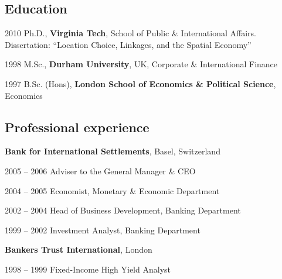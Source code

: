 \documentclass[letter,11pt]{article}
\newlength{\cvlabelw}
\newenvironment{cvlist}[1][2.5cm]{%
  \setlength{\cvlabelw}{#1}%
  \begin{list}{}{%
    \setlength{\leftmargin}{\cvlabelw}\setlength{\labelwidth}{\cvlabelw}%
    \setlength{\labelsep}{0pt}\setlength{\itemindent}{0pt}\setlength{\listparindent}{0pt}%
    \setlength{\itemsep}{4pt}\setlength{\parsep}{0pt}\setlength{\topsep}{3pt}\setlength{\partopsep}{0pt}%
    \renewcommand{\makelabel}[1]{##1\hfil}}}{\end{list}}
\begin{document}
\subsection*{Education}
\begin{cvlist}[2.3cm]
\item[2010] Ph.D., \textbf{Virginia Tech}, School of Public \& International Affairs. Dissertation: \enquote{Location Choice, Linkages, and the Spatial Economy}
\item[1998] M.Sc., \textbf{Durham University}, UK, Corporate \& International Finance
\item[1997] B.Sc. (Hons), \textbf{London School of Economics \& Political Science}, Economics
\end{cvlist}

\subsection*{Professional experience}
\noindent\textbf{Bank for International Settlements}, Basel, Switzerland
\begin{cvlist}[2.3cm]
\item[2005 -- 2006] Adviser to the General Manager \& CEO
\item[2004 -- 2005] Economist, Monetary \& Economic Department
\item[2002 -- 2004] Head of Business Development, Banking Department
\item[1999 -- 2002] Investment Analyst, Banking Department
\end{cvlist}
\vspace{4pt}\noindent\textbf{Bankers Trust International}, London
\begin{cvlist}[2.3cm]
\item[1998 -- 1999] Fixed-Income High Yield Analyst
\end{cvlist}

\pagestyle{fancy}
\end{document}
